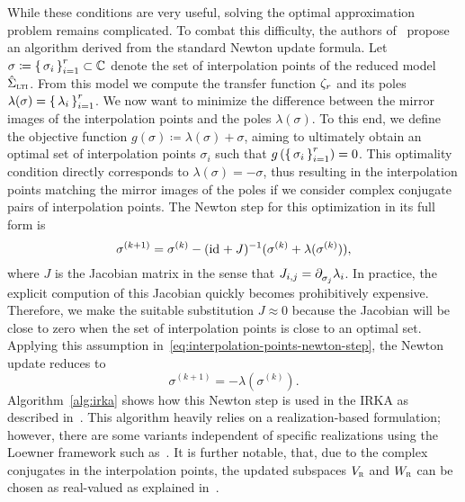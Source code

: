 While these conditions are very useful, solving the optimal approximation problem remains complicated.
To combat this difficulty, the authors of~\cite{Gugercin2008} propose an algorithm derived from the standard Newton update formula.
Let $\sigma \coloneqq {\sset{\sigma_i}}_{i = 1}^r \subset \bb{C}$ denote the set of interpolation points of the reduced model $\hat{\Sigma}_\msc{lti}$.
From this model we compute the transfer function $\tfunc_r$ and its poles $\lambda(\sigma) = {\sset{\lambda_i}}_{i = 1}^r$.
We now want to minimize the difference between the mirror images of the interpolation points and the poles $\lambda(\sigma)$.
To this end, we define the objective function $g(\sigma) \coloneqq \lambda(\sigma) + \sigma$, aiming to ultimately obtain an optimal set of interpolation points $\sigma_i$ such that $g\left( {\sset{\sigma_i}}_{i = 1}^r \right) = 0$.
This optimality condition directly corresponds to $\lambda(\sigma) = -\sigma$, thus resulting in the interpolation points matching the mirror images of the poles if we consider complex conjugate pairs of interpolation points.
The Newton step for this optimization in its full form is
\begin{equation}\label{eq:interpolation-points-newton-step}
    \sigma^{(k + 1)} = \sigma^{(k)} - (\id + J)\inv (\sigma^{(k)} + \lambda(\sigma^{(k)})),
\end{equation}
where $J$ is the Jacobian matrix in the sense that $J_{i, j} = \pd[\sigma_j]{} \lambda_i$.
In practice, the explicit compution of this Jacobian quickly becomes prohibitively expensive.
Therefore, we make the suitable substitution $J \approx 0$ because the Jacobian will be close to zero when the set of interpolation points is close to an optimal set.
Applying this assumption in~\eqref{eq:interpolation-points-newton-step}, the Newton update reduces to
\begin{equation*}
    \sigma^{(k + 1)} = - \lambda(\sigma^{(k)}).
\end{equation*}
Algorithm~\ref{alg:irka} shows how this Newton step is used in the \acf{IRKA} as described in~\cite[Algorithm~4.1]{Gugercin2008}.
This algorithm heavily relies on a realization-based formulation; however, there are some variants independent of specific realizations using the Loewner framework such as~\cite[Algorithm~7.2]{Beattie2017}.
It is further notable, that, due to the complex conjugates in the interpolation points, the updated subspaces $V_\msc{r}$ and $W_\msc{r}$ can be chosen as real-valued as explained in~\cite[Remark~4]{Gugercin2012}.

